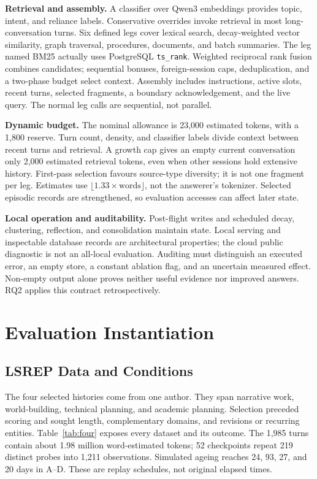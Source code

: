\documentclass[11pt]{article}
\begin{document}
\textbf{Retrieval and assembly.} A classifier over Qwen3 embeddings provides topic, intent, and reliance labels. Conservative overrides invoke retrieval in most long-conversation turns. Six defined legs cover lexical search, decay-weighted vector similarity, graph traversal, procedures, documents, and batch summaries. The leg named BM25 actually uses PostgreSQL \texttt{ts\_rank}. Weighted reciprocal rank fusion combines candidates; sequential bonuses, foreign-session caps, deduplication, and a two-phase budget select context. Assembly includes instructions, active slots, recent turns, selected fragments, a boundary acknowledgement, and the live query. The normal leg calls are sequential, not parallel.

\textbf{Dynamic budget.} The nominal allowance is 23,000 estimated tokens, with a 1,800 reserve. Turn count, density, and classifier labels divide context between recent turns and retrieval. A growth cap gives an empty current conversation only 2,000 estimated retrieval tokens, even when other sessions hold extensive history. First-pass selection favours source-type diversity; it is not one fragment per leg. Estimates use $\lfloor1.33\times\text{words}\rfloor$, not the answerer's tokenizer. Selected episodic records are strengthened, so evaluation accesses can affect later state.

\textbf{Local operation and auditability.} Post-flight writes and scheduled decay, clustering, reflection, and consolidation maintain state. Local serving and inspectable database records are architectural properties; the cloud public diagnostic is not an all-local evaluation. Auditing must distinguish an executed error, an empty store, a constant ablation flag, and an uncertain measured effect. Non-empty output alone proves neither useful evidence nor improved answers. RQ2 applies this contract retrospectively.

\section{Evaluation Instantiation}
\subsection{LSREP Data and Conditions}
The four selected histories come from one author. They span narrative work, world-building, technical planning, and academic planning. Selection preceded scoring and sought length, complementary domains, and revisions or recurring entities. Table~\ref{tab:four} exposes every dataset and its outcome. The 1,985 turns contain about 1.98 million word-estimated tokens; 52 checkpoints repeat 219 distinct probes into 1,211 observations. Simulated ageing reaches 24, 93, 27, and 20 days in A--D. These are replay schedules, not original elapsed times.
\end{document}
